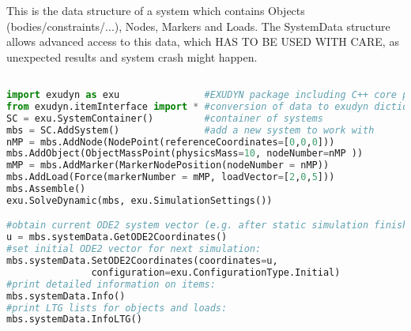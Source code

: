 \label{sec:mbs:systemData}



This is the data structure of a system which contains Objects (bodies/constraints/...), Nodes, Markers and Loads. The SystemData structure allows advanced access to this data, which HAS TO BE USED WITH CARE, as unexpected results and system crash might happen.
\pythonstyle
\begin{lstlisting}[language=Python, firstnumber=1]

import exudyn as exu               #EXUDYN package including C++ core part
from exudyn.itemInterface import * #conversion of data to exudyn dictionaries
SC = exu.SystemContainer()         #container of systems
mbs = SC.AddSystem()               #add a new system to work with
nMP = mbs.AddNode(NodePoint(referenceCoordinates=[0,0,0]))
mbs.AddObject(ObjectMassPoint(physicsMass=10, nodeNumber=nMP ))
mMP = mbs.AddMarker(MarkerNodePosition(nodeNumber = nMP))
mbs.AddLoad(Force(markerNumber = mMP, loadVector=[2,0,5]))
mbs.Assemble()
exu.SolveDynamic(mbs, exu.SimulationSettings())

#obtain current ODE2 system vector (e.g. after static simulation finished):
u = mbs.systemData.GetODE2Coordinates()
#set initial ODE2 vector for next simulation:
mbs.systemData.SetODE2Coordinates(coordinates=u,
               configuration=exu.ConfigurationType.Initial)
#print detailed information on items:
mbs.systemData.Info()
#print LTG lists for objects and loads:
mbs.systemData.InfoLTG()
\end{lstlisting}

